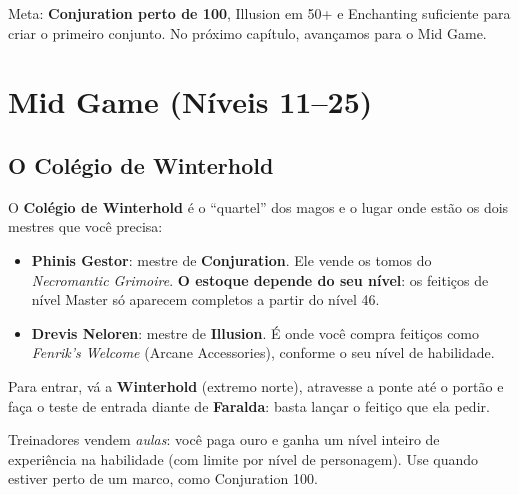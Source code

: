 \documentclass[11pt,a4paper,oneside,openany]{book}
\newcommand{\magia}[1]{\textit{\textcolor{SoulCairnPurple}{#1}}}
\newcommand{\lugar}[1]{\textbf{\textcolor{ImperialGold!75!black}{#1}}}
\newcommand{\npc}[1]{\textbf{#1}}
\begin{document}
\begin{checkpoint}
Meta: \textbf{Conjuration perto de 100}, Illusion em 50+ e Enchanting suficiente para criar o primeiro conjunto. No próximo capítulo, avançamos para o Mid Game.
\end{checkpoint}

\chapter{Mid Game (Níveis 11--25)}

\section{O Colégio de Winterhold}
O \lugar{Colégio de Winterhold} é o ``quartel'' dos magos e o lugar onde estão os dois mestres que você precisa:
\begin{itemize}
  \item \npc{Phinis Gestor}: mestre de \textbf{Conjuration}. Ele vende os tomos do \emph{Necromantic Grimoire}. \textbf{O estoque depende do seu nível}: os feitiços de nível Master só aparecem completos a partir do nível 46.
  \item \npc{Drevis Neloren}: mestre de \textbf{Illusion}. É onde você compra feitiços como \magia{Fenrik's Welcome} (Arcane Accessories), conforme o seu nível de habilidade.
\end{itemize}
Para entrar, vá a \lugar{Winterhold} (extremo norte), atravesse a ponte até o portão e faça o teste de entrada diante de \npc{Faralda}: basta lançar o feitiço que ela pedir.

\begin{dica}
Treinadores vendem \emph{aulas}: você paga ouro e ganha um nível inteiro de experiência na habilidade (com limite por nível de personagem). Use quando estiver perto de um marco, como Conjuration 100.
\end{dica}

\Needspace{12cm}
\end{document}
